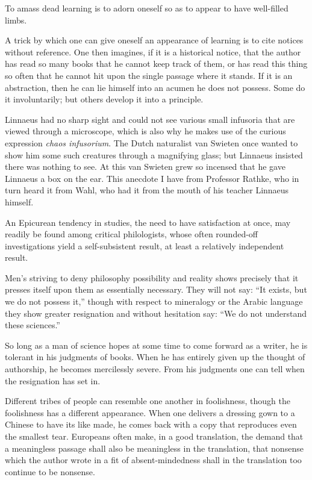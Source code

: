 \documentclass[12pt,a4paper]{article}
\newcommand{\opage}[1]{\marginnote{\footnotesize\textit{[#1]}}}
\newcommand{\aphsep}{\par\smallskip\centerline{\textasteriskcentered}\smallskip}
\begin{document}
\aphsep

To amass dead learning is to adorn oneself so as to appear to have well-filled
limbs.

\aphsep

A trick by which one can give oneself an appearance of learning is to cite
notices without reference. One then imagines, if it is a historical notice, that
the author has read so many books that he cannot keep track of them, or has read
this thing so often that he cannot hit upon the single passage where it stands.
If it is an abstraction, then he can lie himself into an acumen he does not
possess. Some do it involuntarily; but others develop it into a principle.

\aphsep

\opage{26}Linnaeus had no sharp sight and could not see various small infusoria
that are viewed through a microscope, which is also why he makes use of the
curious expression \textit{chaos infusorium}. The Dutch naturalist van Swieten
once wanted to show him some such creatures through a magnifying glass; but
Linnaeus insisted there was nothing to see. At this van Swieten grew so incensed
that he gave Linnaeus a box on the ear. This anecdote I have from Professor
Rathke, who in turn heard it from Wahl, who had it from the mouth of his teacher
Linnaeus himself.

\aphsep

An Epicurean tendency in studies, the need to have satisfaction at once, may
readily be found among critical philologists, whose often rounded-off
investigations yield a self-subsistent result, at least a relatively independent
result.

\aphsep

Men's striving to deny philosophy possibility and reality shows precisely that it
presses itself upon them as essentially necessary. They will not say: ``It
exists, but we do not possess it,'' though with respect to mineralogy or the
Arabic language they show greater resignation and without hesitation say: ``We do
not understand these sciences.''

\aphsep

So long as a man of science hopes at some time to come forward as a writer, he is
tolerant in his judgments of books. When he has entirely given up the thought of
authorship, he becomes mercilessly severe. From his judgments one can tell when
the resignation has set in.

\aphsep

Different tribes of people can resemble one another in foolishness, though the
foolishness has a different appearance. \opage{27}When one delivers a dressing
gown to a Chinese to have its like made, he comes back with a copy that
reproduces even the smallest tear. Europeans often make, in a good translation,
the demand that a meaningless passage shall also be meaningless in the
translation, that nonsense which the author wrote in a fit of absent-mindedness
shall in the translation too continue to be nonsense.
\end{document}

